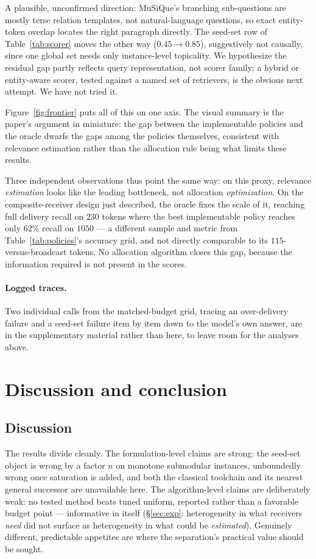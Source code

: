 \documentclass[sigconf,anonymous]{aamas}
\theoremstyle{remark}
\begin{document}
A plausible, unconfirmed direction: MuSiQue's branching sub-questions
are mostly terse relation templates, not natural-language questions,
so exact entity-token overlap locates the right paragraph directly.
The seed-set row of Table~\ref{tab:scorer} moves the other way
($0.45\to0.85$), suggestively not causally, since one global set needs
only instance-level topicality. We hypothesize the residual gap partly
reflects query representation, not scorer family; a hybrid or
entity-aware scorer, tested against a named set of retrievers, is the
obvious next attempt. We have not tried it.

Figure~\ref{fig:frontier} puts all of this on one axis. The visual
summary is the paper's argument in miniature: the gap between the
implementable policies and the oracle dwarfs the gaps among the
policies themselves, consistent with relevance estimation rather than
the allocation rule being what limits these results.

Three independent observations thus point the same way: on this proxy,
relevance \emph{estimation} looks like the leading bottleneck, not
allocation \emph{optimization}. On the composite-receiver design just described,
the oracle fixes the scale of it, reaching full delivery recall on
$230$ tokens where the best implementable policy reaches only $62\%$
recall on $1050$ --- a different sample and metric from
Table~\ref{tab:policies}'s accuracy grid, and not directly comparable
to its $115$-versus-broadcast tokens. No allocation algorithm closes
this gap, because the information required is not present in the
scores.

\paragraph{Logged traces.} Two individual calls from the matched-budget
grid, tracing an over-delivery failure and a seed-set failure item by
item down to the model's own answer, are in the supplementary material
rather than here, to leave room for the analyses above.

\section{Discussion and conclusion}
\subsection{Discussion}
\label{sec:disc}

The results divide cleanly. The formulation-level claims are strong:
the seed-set object is wrong by a factor $n$ on monotone submodular
instances, unboundedly wrong once saturation is added, and both the
classical toolchain and its nearest general successor are unavailable
here. The algorithm-level claims are deliberately weak: no tested
method beats tuned uniform, reported rather than a favorable budget
point --- informative in itself (\S\ref{sec:exp}: heterogeneity in what
receivers \emph{need} did not surface as heterogeneity in what could be
\emph{estimated}). Genuinely different, predictable appetites are where
the separation's practical value should be sought.
\end{document}
